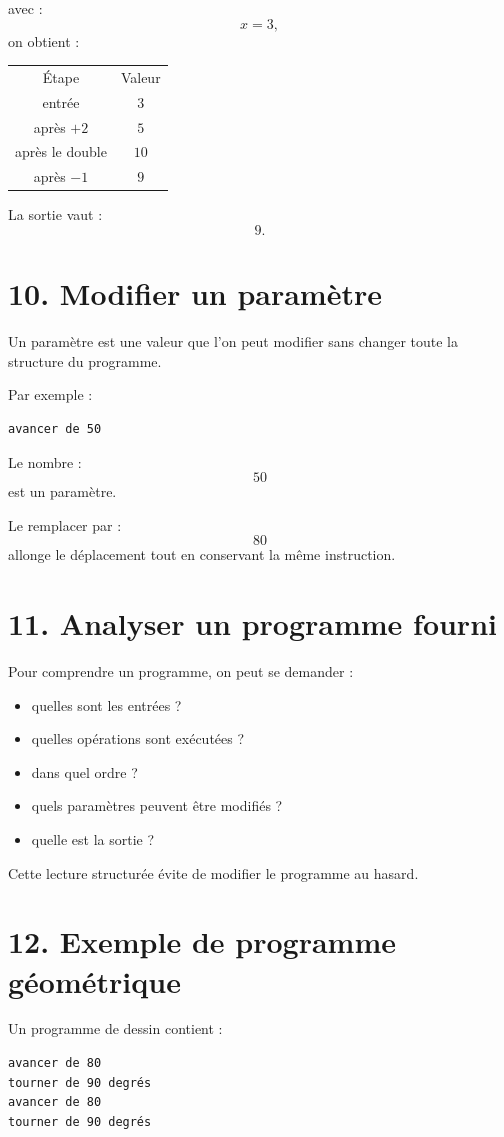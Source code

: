 avec :
\[
x=3,
\]
on obtient :

\begin{tabular}{c|c}
Étape & Valeur \\
entrée & $3$ \\
après $+2$ & $5$ \\
après le double & $10$ \\
après $-1$ & $9$ \\
\end{tabular}

La sortie vaut :
\[
\boxed{9}.
\]

\section{10. Modifier un paramètre}

Un paramètre est une valeur que l'on peut modifier sans changer toute la structure du programme.

Par exemple :
\begin{verbatim}
avancer de 50
\end{verbatim}

Le nombre :
\[
50
\]
est un paramètre.

Le remplacer par :
\[
80
\]
allonge le déplacement tout en conservant la même instruction.

\section{11. Analyser un programme fourni}

Pour comprendre un programme, on peut se demander :
\begin{itemize}
\item quelles sont les entrées ?
\item quelles opérations sont exécutées ?
\item dans quel ordre ?
\item quels paramètres peuvent être modifiés ?
\item quelle est la sortie ?
\end{itemize}

Cette lecture structurée évite de modifier le programme au hasard.

\section{12. Exemple de programme géométrique}

Un programme de dessin contient :
\begin{verbatim}
avancer de 80
tourner de 90 degrés
avancer de 80
tourner de 90 degrés
\end{verbatim}

